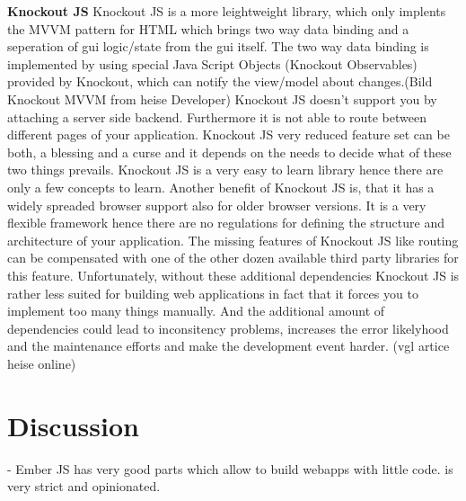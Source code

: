 \textbf{Knockout JS}  Knockout JS is a more leightweight library, which only implents the MVVM pattern for HTML which brings two way data binding and a seperation of gui logic/state from the gui itself. The two way data binding is implemented by using special Java Script Objects (Knockout Observables) provided by Knockout, which can notify the view/model about changes.(Bild Knockout MVVM from heise Developer) Knockout JS doesn't support you by attaching a server side backend. Furthermore it is not able to route between different pages of your application. Knockout JS very reduced feature set can be both, a blessing and a curse and it depends on the needs to decide what of these two things prevails. Knockout JS is a very easy to learn library hence there are only a few concepts to learn. Another benefit of Knockout JS is, that it has a widely spreaded browser support also for older browser versions. It is a very flexible framework hence there are  no regulations for defining the structure and architecture of your application. The missing features of Knockout JS like routing can be compensated with one of the other dozen available third party libraries for this feature. Unfortunately, without these additional dependencies Knockout JS is rather less suited for building web applications in fact that it forces you to implement too many things manually. And the additional amount of dependencies could lead to inconsitency problems, increases the error likelyhood and the maintenance efforts and make the development event harder. (vgl artice heise online)     



\section{Discussion}

- Ember JS has very good parts which allow to build webapps with little code.  is very strict and opinionated.  

